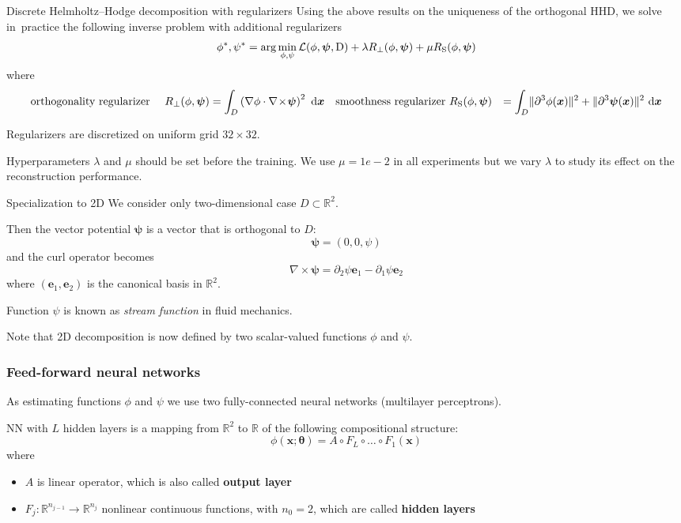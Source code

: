 \documentclass[11pt,aspectratio=169,t]{beamer}
\def\\{}%
\renewcommand{\vec}[1]{\boldsymbol{#1}}
\newcommand{\VTheta}{\ensuremath{\vec{\theta}}}
\newcommand{\R}{\mathbb R}
\DeclarePairedDelimiter\norm{\lVert}{\rVert}
\newcommand{\dd}{\,\textrm{d}}
\newcommand{\Grad}{\nabla}
\newcommand{\Curl}{\nabla \! \times \!}
\newcommand{\xx}{\vec{x}}
\begin{document}
\begin{frame}{Discrete Helmholtz--Hodge decomposition with regularizers}
Using the above results on the uniqueness of the orthogonal HHD, we solve
in~practice the following inverse problem with additional regularizers
\[
\phi^{*}, \psi^{*} =
\arg \min_{\phi, \psi} \mathcal L(\phi, \vec \psi, \mathrm D)
  + \lambda R_{\perp}(\phi, \vec \psi) + \mu R_{\text S}(\phi, \vec \psi)
\]
where
\begin{align*}
&\text{orthogonality regularizer }
&R_{\perp}(\phi, \vec \psi) &=
    \int_{D} \left(\Grad \phi \cdot \Curl \vec \psi \right)^{2} \, \dd \xx \\
&\text{smoothness regularizer }
&R_{\text S}(\phi, \vec \psi) &=
    \int_{D} \norm{\partial^{3}\phi(\xx)}^{2} + \norm{\partial^{3}\vec \psi(\xx)}^{2} \, \dd \xx
\end{align*}

Regularizers are discretized on uniform grid $32\times32$.

Hyperparameters $\lambda$ and $\mu$ should be set before the training.
We use $\mu=1e-2$ in all experiments but we vary $\lambda$ to study its effect
on the reconstruction performance.

\end{frame}

\begin{frame}{Specialization to 2D}
We consider only two-dimensional case $D \subset \R^{2}$.

Then the vector potential $\vec \psi$ is a vector that is orthogonal to $D$:
\[
 \vec \psi = (0, 0, \psi)
\]
and the curl operator becomes
\[
\Curl \vec \psi = \partial_{2} \psi \vec e_{1} - \partial_{1} \psi \vec e_{2}
\]
where $(\vec e_{1}, \vec e_{2})$ is the canonical basis in $\R^{2}$.

Function $\psi$ is known as \emph{stream function} in fluid mechanics.

Note that 2D decomposition is now defined by two scalar-valued functions $\phi$
and $\psi$.
\end{frame}


\begin{frame}
\frametitle{Feed-forward neural networks}

As estimating functions $\phi$ and $\psi$ we use two
fully-connected neural networks (multilayer perceptrons).

NN with \(L\) hidden layers is a mapping from
\(\R^{2}\) to \(\R\)
of the following compositional structure:
\[
    \phi(\xx; \VTheta) = A \circ F_{L} \circ \dots \circ F_1(\xx)
\]
where
\begin{itemize}
    \item \(A\) is linear operator, which is also called \textbf{output layer}
    \item \(F_j : \R^{n_{j-1}} \to \R^{n_j} \) nonlinear continuous
    functions, with \(n_0 = 2\), which are called \textbf{hidden layers}
\end{itemize}
\end{frame}
\end{document}
